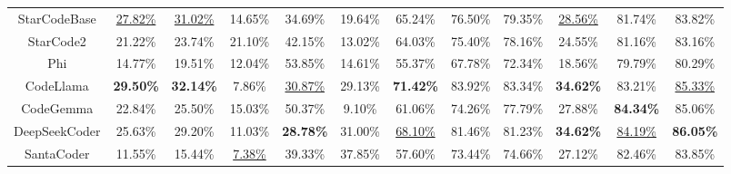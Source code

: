 \begin{table}[htbp]
{\begin{tabular}{cccccccccccc}
    StarCodeBase & \uline{27.82\%} & \uline{31.02\%} & 14.65\% & 34.69\% & 19.64\% & 65.24\% & 76.50\% & 79.35\% & \uline{28.56\%} & 81.74\% & 83.82\%  \\ 
    StarCode2 & 21.22\% & 23.74\% & 21.10\% & 42.15\% & 13.02\% & 64.03\% & 75.40\% & 78.16\% & 24.55\% & 81.16\% & 83.16\%  \\ 
    Phi & 14.77\% & 19.51\% & 12.04\% & 53.85\% & 14.61\% & 55.37\% & 67.78\% & 72.34\% & 18.56\% & 79.79\% & 80.29\%  \\ 
    CodeLlama & \textbf{29.50\%} & \textbf{32.14\%} & 7.86\% & \uline{30.87\%} & 29.13\% & \textbf{71.42\%} & 83.92\% & 83.34\% & \textbf{34.62\%} & 83.21\% & \uline{85.33\%}  \\ 
    CodeGemma & 22.84\% & 25.50\% & 15.03\% & 50.37\% & 9.10\% & 61.06\% & 74.26\% & 77.79\% & 27.88\% & \textbf{84.34\%} & 85.06\%  \\ 
    DeepSeekCoder & 25.63\% & 29.20\% & 11.03\% & \textbf{28.78\%} & 31.00\% & \uline{68.10\%} & 81.46\% & 81.23\% & \textbf{34.62\%} & \uline{84.19\%} & \textbf{86.05\%}  \\ 
    SantaCoder & 11.55\% & 15.44\% & \uline{7.38\%} & 39.33\% & 37.85\% & 57.60\% & 73.44\% & 74.66\% & 27.12\% & 82.46\% & 83.85\% \\ 
    \bottomrule
    \end{tabular}
    }
\end{table}
